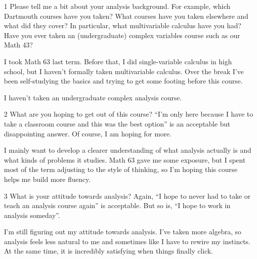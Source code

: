 \documentclass[12pt]{article}
\begin{document}


\begin{problem}{1}
    Please tell me a bit about your analysis background. For example, which Dartmouth courses have you taken? What courses have you taken elsewhere and what did they cover? In particular, what multivariable calculus have you had? Have you ever taken an (undergraduate) complex variables course such as our Math 43?
\end{problem}

\begin{solution}
    \bbni 

    I took Math 63 last term. Before that, I did single-variable calculus in high school, but I haven't formally taken multivariable calculus. Over the break I've been self-studying the basics and trying to get some footing before this course.

    I haven't taken an undergraduate complex analysis course.
\end{solution}

\vspace{1em}

\begin{problem}{2}
    What are you hoping to get out of this course? “I'm only here because I have to take a classroom course and this was the best option” is an acceptable but disappointing answer. Of course, I am hoping for more.
\end{problem}

\begin{solution}
    \bbni 
    
     I mainly want to develop a clearer understanding of what analysis actually is and what kinds of problems it studies. Math 63 gave me some exposure, but I spent most of the term adjusting to the style of thinking, so I'm hoping this course helps me build more fluency. 
\end{solution}

\newpage

\begin{problem}{3}
    What is your attitude towards analysis? Again, “I hope to never had to take or teach an analysis course again” is acceptable. But so is, “I hope to work in analysis someday”.
\end{problem}


\begin{solution}
    \bbni 
    
    I'm still figuring out my attitude towards analysis. I've taken more algebra, so analysis feels less natural to me and sometimes like I have to rewire my instincts. At the same time, it is incredibly satisfying when things finally click.
\end{solution}
\end{document}
